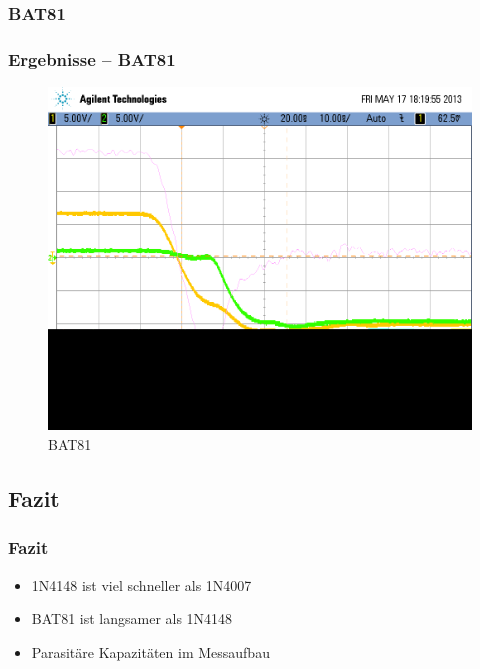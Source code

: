 \subsubsection{BAT81}
\begin{frame}
\frametitle{Ergebnisse -- BAT81}
  \begin{figure}
    \includegraphics[width=0.7\columnwidth]{fig/scope_20_2.png}
    \caption{BAT81}
  \end{figure}
\end{frame}

\subsection{Fazit}
\begin{frame}
\frametitle{Fazit}
  \begin{itemize}
    \item 1N4148 ist viel schneller als 1N4007
    \item BAT81 ist langsamer als 1N4148
    \item Parasitäre Kapazitäten im Messaufbau
  \end{itemize}
\end{frame}
